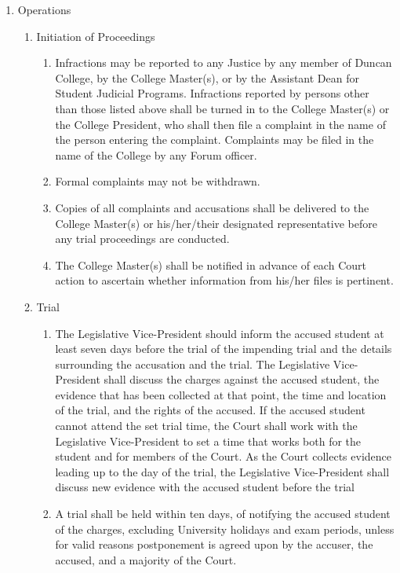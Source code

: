 \documentclass[11pt]{amsart}
\begin{document}
\begin{enumerate}
\begin{enumerate}
	\end{enumerate}
\item Operations
	\begin{enumerate}
		\item Initiation of Proceedings
			\begin{enumerate}
			\item Infractions may be reported to any Justice by any member of Duncan College, by the College Master(s), or by the Assistant Dean for Student Judicial Programs. Infractions reported by persons other than those listed above shall be turned in to the College Master(s) or the College President, who shall then file a complaint in the name of the person entering the complaint. Complaints may be filed in the name of the College by any Forum officer.
			\item Formal complaints may not be withdrawn.
			\item Copies of all complaints and accusations shall be delivered to the College Master(s) or his/her/their designated representative before any trial proceedings are conducted.
			\item The College Master(s) shall be notified in advance of each Court action to ascertain whether information from his/her files is pertinent.
			\end{enumerate}
		\item Trial 
			\begin{enumerate}
			\item The Legislative Vice-President should inform the accused student at least seven days before the trial of the impending trial and the details surrounding the accusation and the trial. The Legislative Vice-President shall discuss the charges against the accused student, the evidence that has been collected at that point, the time and location of the trial, and the rights of the accused. If the accused student cannot attend the set trial time, the Court shall work with the Legislative Vice-President to set a time that works both for the student and for members of the Court. As the Court collects evidence leading up to the day of the trial, the Legislative Vice-President shall discuss new evidence with the accused student before the trial
			\item A trial shall be held within ten days, of notifying the accused student of the charges, excluding University holidays and exam periods, unless for valid reasons postponement is agreed upon by the accuser, the accused, and a majority of the Court.

\end{enumerate}
\end{enumerate}
\end{enumerate}
\end{document}

